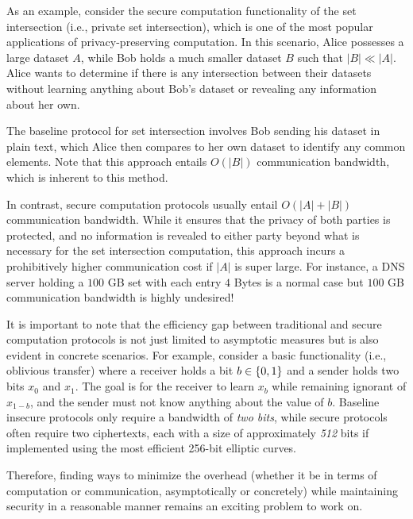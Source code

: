 As an example, consider the secure computation functionality of the set intersection (i.e., private set intersection), which is one of the most popular applications of privacy-preserving computation. In this scenario, Alice possesses a large dataset $A$, while Bob holds a much smaller dataset $B$ such that $|B| \ll |A|$. Alice wants to determine if there is any intersection between their datasets without learning anything about Bob's dataset or revealing any information about her own.

The baseline protocol for set intersection involves Bob sending his dataset in plain text, which Alice then compares to her own dataset to identify any common elements. Note that this approach entails $O(|B|)$ communication bandwidth, which is inherent to this method.

In contrast, secure computation protocols usually entail $O(|A|+|B|)$ communication bandwidth. While it ensures that the privacy of both parties is protected, and no information is revealed to either party beyond what is necessary for the set intersection computation, this approach incurs a prohibitively higher communication cost if $|A|$ is super large. For instance, a DNS server holding a $100$ GB set with each entry $4$ Bytes is a normal case but $100$ GB communication bandwidth is highly undesired!

It is important to note that the efficiency gap between traditional and secure computation protocols is not just limited to asymptotic measures but is also evident in concrete scenarios. For example, consider a basic functionality (i.e., oblivious transfer) where a receiver holds a bit $b \in \{0,1\}$ and a sender holds two bits $x_0$ and $x_1$. The goal is for the receiver to learn $x_b$ while remaining ignorant of $x_{1-b}$, and the sender must not know anything about the value of $b$. Baseline insecure protocols only require a bandwidth of \emph{two bits}, while secure protocols often require two ciphertexts, each with a size of approximately \emph{512} bits if implemented using the most efficient 256-bit elliptic curves.

Therefore, finding ways to minimize the overhead (whether it be in terms of computation or communication, asymptotically or concretely) while maintaining security in a reasonable manner remains an exciting problem to work on.

